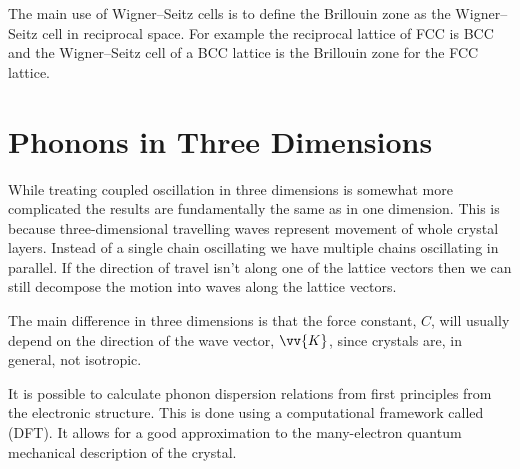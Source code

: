 \documentclass[fleqn]{NotesClass}
\begin{document}
    The main use of Wigner--Seitz cells is to define the Brillouin zone as the Wigner--Seitz cell in reciprocal space.
    For example the reciprocal lattice of FCC is BCC and the Wigner--Seitz cell of a BCC lattice is the Brillouin zone for the FCC lattice.
    
    \section{Phonons in Three Dimensions}
    While treating coupled oscillation in three dimensions is somewhat more complicated the results are fundamentally the same as in one dimension.
    This is because three-dimensional travelling waves represent movement of whole crystal layers.
    Instead of a single chain oscillating we have multiple chains oscillating in parallel.
    If the direction of travel isn't along one of the lattice vectors then we can still decompose the motion into waves along the lattice vectors.
    
    The main difference in three dimensions is that the force constant, \(C\), will usually depend on the direction of the wave vector, \(\vv{K}\), since crystals are, in general, not isotropic.
    
    It is possible to calculate phonon dispersion relations from first principles from the electronic structure.
    This is done using a computational framework called  (DFT).
    It allows for a good approximation to the many-electron quantum mechanical description of the crystal.
    
\end{document}
